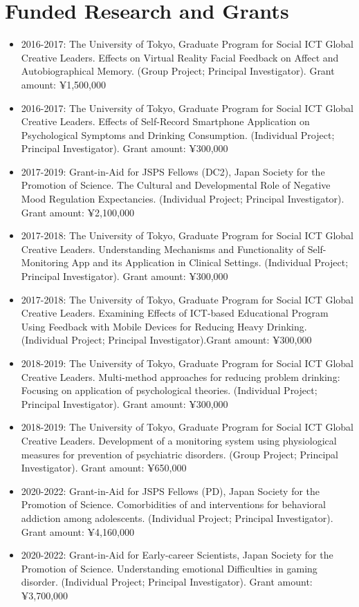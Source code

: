 \documentclass{article}
\begin{document}
\section{Funded Research and Grants}
\begin{itemize}
	\item 2016-2017: The University of Tokyo, Graduate Program for Social ICT Global Creative Leaders. Effects on Virtual Reality Facial Feedback on Affect and Autobiographical Memory. (Group Project; Principal Investigator). Grant amount: ¥1,500,000
	\item 2016-2017: The University of Tokyo, Graduate Program for Social ICT Global Creative Leaders. Effects of Self-Record Smartphone Application on Psychological Symptoms and Drinking Consumption. (Individual Project; Principal Investigator). Grant amount: ¥300,000
	\item 2017-2019: Grant-in-Aid for JSPS Fellows (DC2), Japan Society for the Promotion of Science. The Cultural and Developmental Role of Negative Mood Regulation Expectancies. (Individual Project; Principal Investigator). Grant amount: ¥2,100,000
	\item 2017-2018: The University of Tokyo, Graduate Program for Social ICT Global Creative Leaders. Understanding Mechanisms and Functionality of Self-Monitoring App and its Application in Clinical Settings. (Individual Project; Principal Investigator). Grant amount: ¥300,000
	\item 2017-2018: The University of Tokyo, Graduate Program for Social ICT Global Creative Leaders. Examining Effects of ICT-based Educational Program Using Feedback with Mobile Devices for Reducing Heavy Drinking. (Individual Project; Principal Investigator).Grant amount: ¥300,000
	\item 2018-2019: The University of Tokyo, Graduate Program for Social ICT Global Creative Leaders. Multi-method approaches for reducing problem drinking: Focusing on application of psychological theories. (Individual Project; Principal Investigator). Grant amount: ¥300,000
	\item 2018-2019: The University of Tokyo, Graduate Program for Social ICT Global Creative Leaders. Development of a monitoring system using physiological measures for prevention of psychiatric disorders. (Group Project; Principal Investigator). Grant amount: ¥650,000
	\item 2020-2022: Grant-in-Aid for JSPS Fellows (PD), Japan Society for the Promotion of Science. Comorbidities of and interventions for behavioral addiction among adolescents. (Individual Project; Principal Investigator). Grant amount: ¥4,160,000
	\item 2020-2022: Grant-in-Aid for Early-career Scientists, Japan Society for the Promotion of Science. Understanding emotional Difficulties in gaming disorder. (Individual Project; Principal Investigator). Grant amount: ¥3,700,000
	\end{itemize}
\end{document}
